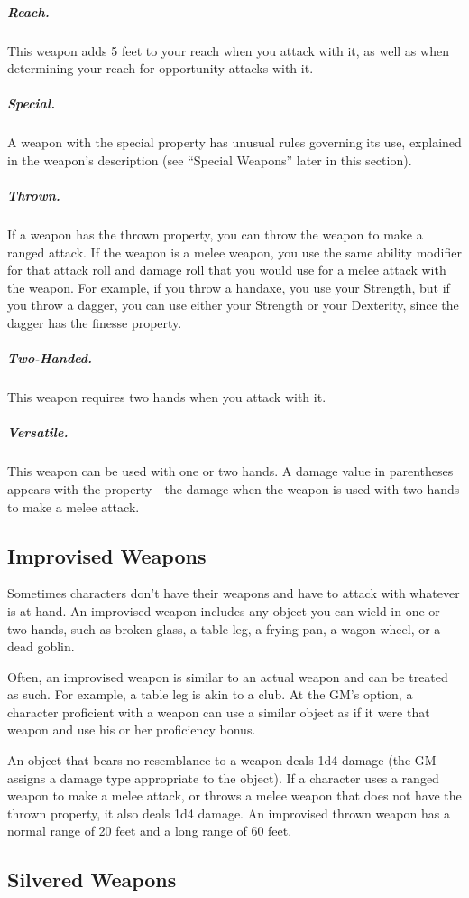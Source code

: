 \subparagraph*{Reach.} This weapon adds 5 feet to your reach when you attack with it, as well as when determining your reach for opportunity attacks with it.

\subparagraph*{Special.} A weapon with the special property has unusual rules governing its use, explained in the weapon's description (see “Special Weapons” later in this section).

\subparagraph*{Thrown.} If a weapon has the thrown property, you can throw the weapon to make a ranged attack. If the weapon is a melee weapon, you use the same ability modifier for that attack roll and damage roll that you would use for a melee attack with the weapon. For example, if you throw a handaxe, you use your Strength, but if you throw a dagger, you can use either your Strength or your Dexterity, since the dagger has the finesse property.

\subparagraph*{Two-Handed.} This weapon requires two hands when you attack with it.

\subparagraph*{Versatile.} This weapon can be used with one or two hands. A damage value in parentheses appears with the property—the damage when the weapon is used with two hands to make a melee attack.

\subsection{Improvised Weapons}

Sometimes characters don't have their weapons and have to attack with whatever is at hand. An improvised weapon includes any object you can wield in one or two hands, such as broken glass, a table leg, a frying pan, a wagon wheel, or a dead goblin.

Often, an improvised weapon is similar to an actual weapon and can be treated as such. For example, a table leg is akin to a club. At the GM's option, a character proficient with a weapon can use a similar object as if it were that weapon and use his or her proficiency bonus.

An object that bears no resemblance to a weapon deals 1d4 damage (the GM assigns a damage type appropriate to the object). If a character uses a ranged weapon to make a melee attack, or throws a melee weapon that does not have the thrown property, it also deals 1d4 damage. An improvised thrown weapon has a normal range of 20 feet and a long range of 60 feet.

\subsection{Silvered Weapons}

